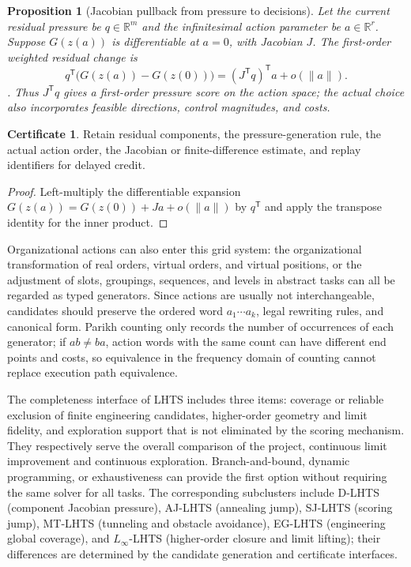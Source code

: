 \documentclass[11pt,a4paper]{article}
\theoremstyle{plain}
\newtheorem{proposition}[theorem]{Proposition}
\theoremstyle{definition}
\newtheorem*{certificate}{Certificate}
\theoremstyle{remark}
\begin{document}
\begin{CJK*}
\begin{proposition} [Jacobian pullback from pressure to decisions]
\label{ss:pressure}
Let the current residual pressure be $q\in\mathbb R^m$ and the infinitesimal action parameter be $a\in\mathbb R^r$. Suppose $G(z(a))$ is differentiable at $a=0$, with Jacobian $J$. The first-order weighted residual change is
\[
 q^{\mathsf T}\bigl(G(z(a))-G(z(0))\bigr)
 =(J^{\mathsf T}q)^{\mathsf T}a+o(\|a\|).
\].
Thus $J^{\mathsf T}q$ gives a first-order pressure score on the action space; the actual choice also incorporates feasible directions, control magnitudes, and costs.
\end{proposition}
\begin{certificate}
Retain residual components, the pressure-generation rule, the actual action order, the Jacobian or finite-difference estimate, and replay identifiers for delayed credit.
\end{certificate}
\begin{proof}
Left-multiply the differentiable expansion $G(z(a))=G(z(0))+Ja+o(\|a\|)$ by $q^{\mathsf T}$ and apply the transpose identity for the inner product.
\end{proof}

Organizational actions can also enter this grid system: the organizational transformation of real orders, virtual orders, and virtual positions, or the adjustment of slots, groupings, sequences, and levels in abstract tasks can all be regarded as typed generators. Since actions are usually not interchangeable, candidates should preserve the ordered word $a_1\cdots a_k$, legal rewriting rules, and canonical form. Parikh counting only records the number of occurrences of each generator; if $ab\ne ba$, action words with the same count can have different end points and costs, so equivalence in the frequency domain of counting cannot replace execution path equivalence.

The completeness interface of LHTS includes three items: coverage or reliable exclusion of finite engineering candidates, higher-order geometry and limit fidelity, and exploration support that is not eliminated by the scoring mechanism. They respectively serve the overall comparison of the project, continuous limit improvement and continuous exploration. Branch-and-bound, dynamic programming, or exhaustiveness can provide the first option without requiring the same solver for all tasks. The corresponding subclusters include D-LHTS (component Jacobian pressure), AJ-LHTS (annealing jump), SJ-LHTS (scoring jump), MT-LHTS (tunneling and obstacle avoidance), EG-LHTS (engineering global coverage), and $L_\infty$-LHTS (higher-order closure and limit lifting); their differences are determined by the candidate generation and certificate interfaces.


\end{CJK*}
\end{document}
